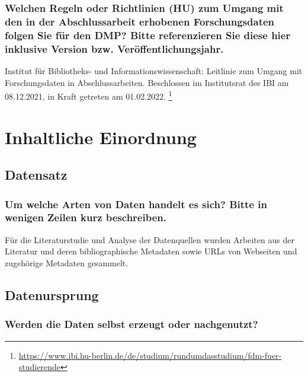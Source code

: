 \subsubsection{Welchen Regeln oder Richtlinien (HU) zum Umgang mit den in der Abschlussarbeit erhobenen Forschungsdaten folgen Sie für den DMP? Bitte referenzieren Sie diese hier inklusive Version bzw. Veröffentlichungsjahr.}

Institut für Bibliotheks- und Informationswissenschaft:
Leitlinie zum Umgang mit Forschungsdaten in Abschlussarbeiten.
Beschlossen im Institutsrat des IBI am 08.12.2021, in Kraft getreten am 01.02.2022.%
\footnote{\url{https://www.ibi.hu-berlin.de/de/studium/rundumdasstudium/fdm-fuer-studierende}}

\section{Inhaltliche Einordnung}


\subsection{Datensatz}

\subsubsection{Um welche Arten von Daten handelt es sich? Bitte in wenigen Zeilen kurz beschreiben.}

Für die Literaturstudie und Analyse der Datenquellen wurden Arbeiten aus der Literatur und deren bibliographische Metadaten
sowie URLs von Webseiten und zugehörige Metadaten gesammelt.

\subsection{Datenursprung}

\subsubsection{Werden die Daten selbst erzeugt oder nachgenutzt?}

